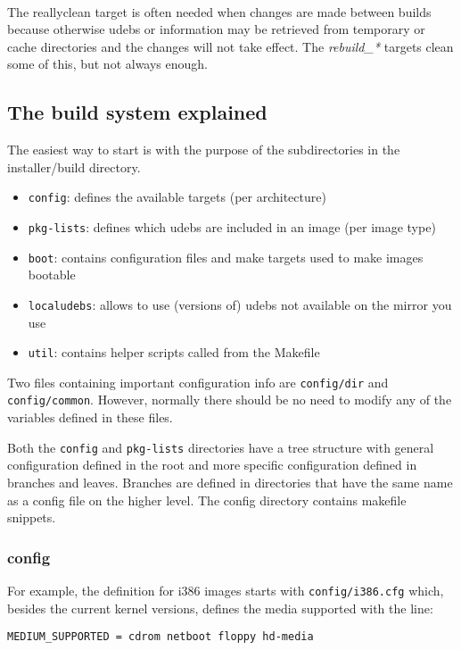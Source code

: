 \documentclass[a4paper,10pt]{article}
\begin{document}
\

The reallyclean target is often needed when changes are made between builds because otherwise udebs or information may be retrieved from temporary or cache directories and the changes will not take effect. The \textit{rebuild\_*} targets clean some of this, but not always enough. 


\subsection{The build system explained}
The easiest way to start is with the purpose of the subdirectories in the installer/build directory. 

\begin{itemize}
\item \texttt{config}: defines the available targets (per architecture) 
\item \texttt{pkg-lists}: defines which udebs are included in an image (per image type) 
\item \texttt{boot}: contains configuration files and make targets used to make images bootable 
\item \texttt{localudebs}: allows to use (versions of) udebs not available on the mirror you use 
\item \texttt{util}: contains helper scripts called from the Makefile 
\end{itemize}

Two files containing important configuration info are \texttt{config/dir} and \texttt{config/common}. However, normally there should be no need to modify any of the variables defined in these files. 

Both the \texttt{config} and \texttt{pkg-lists} directories have a tree structure with general configuration defined in the root and more specific configuration defined in branches and leaves. Branches are defined in directories that have the same name as a config file on the higher level. The config directory contains makefile snippets. 

\subsubsection*{config}
For example, the definition for i386 images starts with \texttt{config/i386.cfg} which, besides the current kernel versions, defines the media supported with the line: 

\begin{verbatim}
MEDIUM_SUPPORTED = cdrom netboot floppy hd-media
\end{verbatim}
\end{document}
